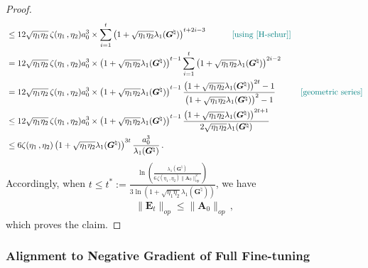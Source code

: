 \begin{proof}
\begin{align}
    & \leq 12 \sqrt{\eta_1 \eta_2} \,\zeta(\eta_1\,,\eta_2) a_0^3 \times \sum_{i=1}^t  \left(1+\sqrt{\eta_1 \eta_2}\lambda_1({\bm G}^{\natural})\right)^{t+2i-3} \quad \tag*{\color{teal}[using~\cref{H-schur}]} \nonumber\\
    & = 12 \sqrt{\eta_1 \eta_2} \,\zeta(\eta_1\,,\eta_2) a_0^3 \times \left(1+\sqrt{\eta_1 \eta_2}\lambda_1({\bm G}^{\natural})\right)^{t-1}\sum_{i=1}^t  \left(1+\sqrt{\eta_1 \eta_2}\lambda_1({\bm G}^{\natural})\right)^{2i-2} \nonumber\\
    & = 12 \sqrt{\eta_1 \eta_2} \,\zeta(\eta_1\,,\eta_2) a_0^3 \times \left(1+\sqrt{\eta_1 \eta_2}\lambda_1({\bm G}^{\natural})\right)^{t-1} \frac{\left(1+\sqrt{\eta_1 \eta_2}\lambda_1({\bm G}^{\natural})\right)^{2t}-1}{\left(1+\sqrt{\eta_1 \eta_2}\lambda_1({\bm G}^{\natural})\right)^2-1} \quad \tag*{\color{teal}[geometric series]} \nonumber\\
    & \leq 12 \sqrt{\eta_1 \eta_2} \,\zeta(\eta_1\,,\eta_2) a_0^3 \times \left(1+\sqrt{\eta_1 \eta_2}\lambda_1({\bm G}^{\natural})\right)^{t-1} \frac{\left(1+\sqrt{\eta_1 \eta_2}\lambda_1({\bm G}^{\natural})\right)^{2t+1}}{2\sqrt{\eta_1 \eta_2}\lambda_1({\bm G}^{\natural})}\nonumber\\
    & \leq 6 \zeta(\eta_1\,,\eta_2) \left(1+\sqrt{\eta_1 \eta_2}\lambda_1({\bm G}^{\natural})\right)^{3t} \frac{a_0^3}{\lambda_1({\bm G}^{\natural})}\label{E_t_induction}\,.
\end{align}
Accordingly, when $t \leq t^* := \frac{\ln\left(\frac{\lambda_1({\bm G}^{\natural})}{6\,\zeta(\eta_1\,,\eta_2) \|\bm A_0\|_{op}^2}\right)}{3\ln\left(1+\sqrt{\eta_1 \eta_2}\lambda_1({\bm G}^{\natural})\right)}$, we have
\begin{align*}
    \|\bm E_t\|_{op} \leq \|\bm A_0\|_{op}\,,
\end{align*}
which proves the claim.
\end{proof}

\subsubsection{Alignment to Negative Gradient of Full Fine-tuning}

